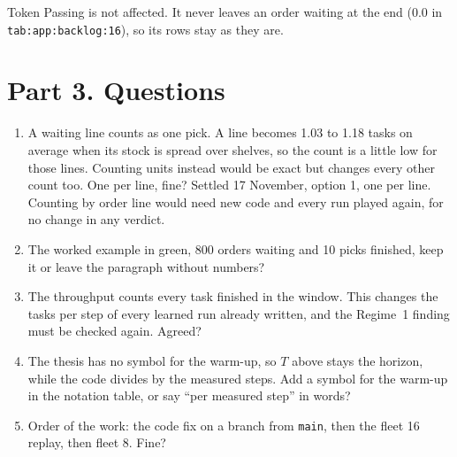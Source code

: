 \documentclass[11pt,a4paper]{article}
\newcommand{\new}[1]{\textcolor{newc}{#1}}
\begin{document}
Token Passing is not affected. It never leaves an order waiting at the end (0.0 in
\texttt{tab:app:backlog:16}), so its rows stay as they are.

\section*{Part 3. Questions}

\begin{enumerate}[leftmargin=1.4em]
\item A waiting line counts as one pick. A line becomes 1.03 to 1.18 tasks on average when its stock
  is spread over shelves, so the count is a little low for those lines. Counting units instead would
  be exact but changes every other count too. One per line, fine? \new{Settled 17 November, option 1, one per line. Counting by order line would need new code and every run played again, for no change in any verdict.}
\item The worked example in green, 800 orders waiting and 10 picks finished, keep it or leave the
  paragraph without numbers?
\item The throughput counts every task finished in the window. This changes the tasks per step of
  every learned run already written, and the Regime~1 finding must be checked again. Agreed?
\item The thesis has no symbol for the warm-up, so $T$ above stays the horizon, while the code divides
  by the measured steps. Add a symbol for the warm-up in the notation table, or say ``per measured
  step'' in words?
\item Order of the work: the code fix on a branch from \texttt{main}, then the fleet 16 replay, then
  fleet 8. Fine?
\end{enumerate}
\end{document}
